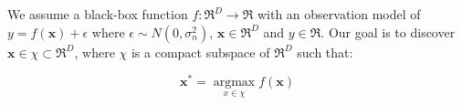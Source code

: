 We assume a black-box function $f:  \Re^{D}\rightarrow \Re$ with an observation model of $y=f(\textbf{x})+\epsilon$ where $\epsilon \sim N(0,\sigma_{n}^{2})$, $\textbf{x} \in \Re^{D}$ and $y \in \Re$. Our goal is to discover  $\textbf{x} \in \chi \subset \Re^{D}$, where $\chi$ is a compact subspace of $\Re^{D}$ such that:

\begin{equation}\label{eq:BO_optimiser}
\textbf{x}^{*} = \operatorname*{argmax}_{x\in \chi}  f(\textbf{x})
\end{equation}